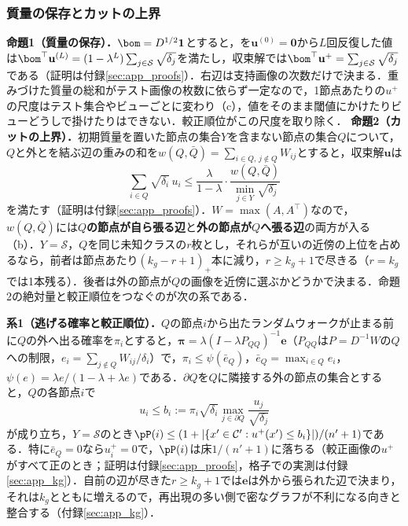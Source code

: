 \subsubsection{質量の保存とカットの上界}
\label{sec:mass}
\textbf{命題1（質量の保存）．}$\bom=D^{1/2}\mathbf{1}$とすると，を$\mathbf{u}^{(0)}=\mathbf{0}$から$L$回反復した値は$\bom^{\top}\mathbf{u}^{(L)}=(1-\lambda^{L})\sum_{j\in\mathcal{S}}\sqrt{\delta_j}$を満たし，収束解では$\bom^{\top}\mathbf{u}^{+}=\sum_{j\in\mathcal{S}}\sqrt{\delta_j}$である（証明は付録\ref{sec:app_proofs}）．右辺は支持画像の次数だけで決まる．重みづけた質量の総和がテスト画像の枚数に依らず一定なので，1節点あたりの$u^{+}$の尺度はテスト集合やビューごとに変わり（c），値をそのまま閾値にかけたりビューどうしで掛けたりはできない．較正順位がこの尺度を取り除く．
\label{sec:cut}
\textbf{命題2（カットの上界）．}初期質量を置いた節点の集合$Y$を含まない節点の集合$Q$について，$Q$と外とを結ぶ辺の重みの和を$w(Q,\bar{Q})=\sum_{i\in Q,\,j\notin Q}W_{ij}$とすると，収束解$\mathbf{u}$は
\begin{equation}
\sum_{i\in Q}\sqrt{\delta_i}\,u_i\le\frac{\lambda}{1-\lambda}\cdot\frac{w(Q,\bar{Q})}{\min_{j\in Y}\sqrt{\delta_j}}
\label{eq:cond}
\end{equation}
を満たす（証明は付録\ref{sec:app_proofs}）．$W=\max(A,A^{\top})$なので，$w(Q,\bar{Q})$には\textbf{$Q$の節点が自ら張る辺}と\textbf{外の節点が$Q$へ張る辺}の両方が入る（b）．$Y=\mathcal{S}$，$Q$を同じ未知クラスの$r$枚とし，それらが互いの近傍の上位を占めるなら，前者は節点あたり$(k_g-r+1)_+$本に減り，$r\ge k_g+1$で尽きる（$r=k_g$では1本残る）．後者は外の節点が$Q$の画像を近傍に選ぶかどうかで決まる．命題2の絶対量と較正順位をつなぐのが次の系である．

\textbf{系1（逃げる確率と較正順位）．}$Q$の節点$i$から出たランダムウォークが止まる前に$Q$の外へ出る確率を$\pi_i$とすると，$\boldsymbol{\pi}=\lambda(I-\lambda P_{QQ})^{-1}\mathbf{e}$（$P_{QQ}$は$P=D^{-1}W$の$Q$への制限，$e_i=\sum_{j\notin Q}W_{ij}/\delta_i$）で，$\pi_i\le\psi(\bar e_Q)$，$\bar e_Q=\max_{i\in Q}e_i$，$\psi(e)=\lambda e/(1-\lambda+\lambda e)$である．$\partial Q$を$Q$に隣接する外の節点の集合とすると，$Q$の各節点$i$で
\begin{equation}
u_i\le b_i:=\pi_i\sqrt{\delta_i}\max_{j\in\partial Q}\frac{u_j}{\sqrt{\delta_j}}
\label{eq:esc}
\end{equation}
が成り立ち，$Y=\mathcal{S}$のとき$\pP(i)\le(1+|\{x'\in\mathcal{C}':u^{+}(x')\le b_i\}|)/(n'+1)$である．特に$\bar e_Q=0$なら$u^{+}_i=0$で，$\pP(i)$は床$1/(n'+1)$に落ちる（較正画像の$u^{+}$がすべて正のとき；証明は付録\ref{sec:app_proofs}，格子での実測は付録\ref{sec:app_kg}）．自前の辺が尽きた$r\ge k_g+1$では$\mathbf{e}$は外から張られた辺で決まり，それは$k_g$とともに増えるので，再出現の多い側で密なグラフが不利になる向きと整合する（付録\ref{sec:app_kg}）．

